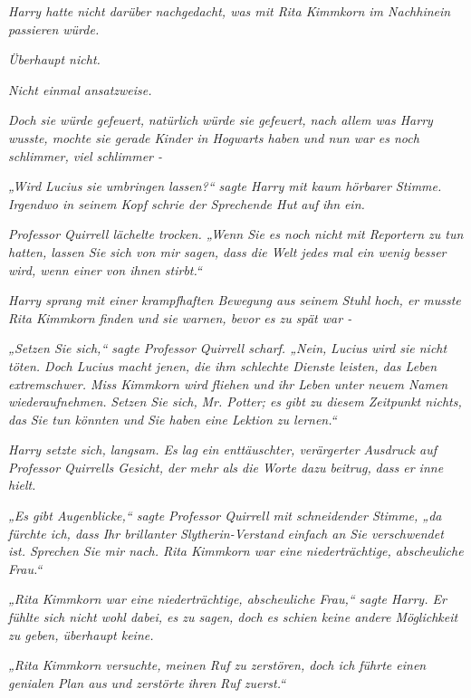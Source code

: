 {\emph{Harry hatte nicht darüber nachgedacht, was mit Rita Kimmkorn im Nachhinein passieren würde.}

\emph{Überhaupt nicht.}

\emph{Nicht einmal ansatzweise.}

\emph{Doch sie würde gefeuert,} \emph{\emph{natürlich}} \emph{würde sie gefeuert, nach allem was Harry wusste, mochte sie gerade Kinder in Hogwarts haben und nun war} \emph{es noch schlimmer, viel schlimmer -}

\emph{„Wird Lucius sie umbringen lassen?“ sagte Harry mit kaum hörbarer Stimme. Irgendwo in seinem Kopf schrie der Sprechende Hut} \emph{auf} \emph{ihn} \emph{ein.}

\emph{Professor Quirrell lächelte trocken. „Wenn Sie es noch nicht mit Reportern zu tun hatten, lassen Sie sich von mir sagen, dass die Welt jedes mal ein wenig} \emph{besser wird, wenn einer von ihnen stirbt.“}

\emph{Harry sprang mit einer krampfhaften Bewegung aus seinem Stuhl hoch, er musste Rita Kimmkorn finden und sie warnen, bevor es zu spät war -}

\emph{„\emph{Setzen Sie sich,}“ sagte Professor Quirrell scharf. „\emph{Nein,}} \emph{Lucius wird sie nicht töten. Doch Lucius macht jenen, die ihm schlechte Dienste leisten, das Leben} \emph{\emph{extrem}schwer. Miss Kimmkorn wird fliehen und ihr Leben unter neuem Namen wiederaufnehmen.} \emph{\emph{Setzen Sie sich,}} \emph{Mr. Potter; es gibt zu diesem Zeitpunkt nichts, das} \emph{Sie tun könnten und} \emph{Sie haben eine Lektion zu lernen.“}

\emph{Harry setzte sich, langsam. Es lag ein enttäuschter, verärgerter Ausdruck auf Professor Quirrells Gesicht, der mehr als die Worte dazu beitrug,} \emph{dass er inne hielt.}

\emph{„Es gibt Augenblicke,“ sagte Professor Quirrell mit schneidender Stimme, „da fürchte ich, dass Ihr brillanter Slytherin-Verstand} \emph{einfach an Sie verschwendet ist. Sprechen Sie mir nach. Rita Kimmkorn war eine} \emph{niederträchtige, abscheuliche Frau.“}

\emph{„Rita Kimmkorn war eine} \emph{niederträchtige, abscheuliche Frau,“ sagte Harry. Er fühlte sich nicht wohl dabei, es zu sagen, doch es schien keine andere Möglichkeit zu geben, überhaupt keine.}

\emph{„Rita Kimmkorn versuchte, meinen Ruf zu zerstören, doch ich führte einen genialen Plan aus und zerstörte} \emph{\emph{ihren}} \emph{Ruf zuerst.“}

}
